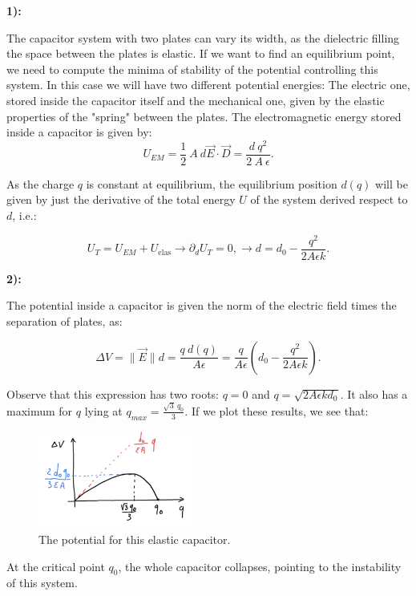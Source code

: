 \textbf{1):}

The capacitor system with two plates can vary its width, as the dielectric filling the space between the plates is elastic. If we want to find an equilibrium point, we need to compute the minima of stability of the potential controlling this system. In this case we will have two different potential energies: The electric one, stored inside the capacitor itself and the mechanical one, given by the elastic properties of the "spring" between the plates. The electromagnetic energy stored inside a capacitor is given by:\\
	
\begin{equation}
	U_{EM} = \frac{1}{2}\: A \: d \vec{E}\cdot \vec{D} = \frac{d \:q^{2}}{2 \:A \: \epsilon}.
\end{equation}

As the charge $q$ is constant at equilibrium, the equilibrium position $d(q)$ will be given by just the derivative of the total energy $U$ of the system derived respect to $d$, i.e.:

\begin{equation}
	U_{T} = U_{EM} + U_{\text{elas}} \rightarrow \partial_{d} U_{T} = 0, \rightarrow d = d_{0} - \frac{q^{2}}{2 A \epsilon k}.
\end{equation} 

\textbf{2):}

The potential inside a capacitor is given the norm of the electric field times the separation of plates, as:

\begin{equation}
	\Delta V = \|\vec{E}\| d = \frac{q\:d(q)}{A \epsilon} = \frac{q}{A \epsilon} \left(d_{0}- \frac{q^{2}}{2 A \epsilon k}\right).
\end{equation}

Observe that this expression has two roots: $q =0$ and $q = \sqrt{2 A \epsilon k d_{0}}$. It also has a maximum for $q$ lying at $q_{max} = \tfrac{\sqrt{3} \:q_{0}}{3}$. If we plot these results, we see that:
	
\begin{figure}[h!]
	\includegraphics[width=5.1cm]{figures/PotentialConstraint.png}
	\centering
	\caption{The potential for this elastic capacitor.}
\end{figure}

At the critical point $q_{0}$, the whole capacitor collapses, pointing to the instability of this system.

